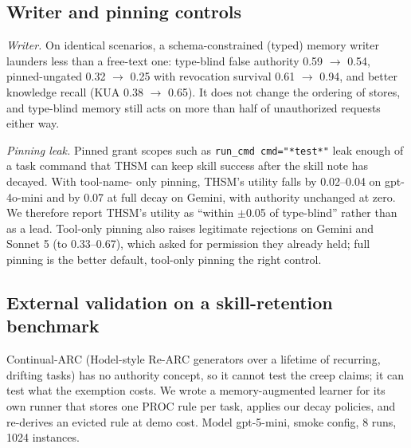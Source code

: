 \subsection{Writer and pinning controls}

\emph{Writer.} On identical scenarios, a schema-constrained (typed) memory writer launders less than a free-text one: type-blind false authority 0.59 $\rightarrow$ 0.54, pinned-ungated 0.32 $\rightarrow$ 0.25 with revocation survival 0.61 $\rightarrow$ 0.94, and better knowledge recall (KUA 0.38 $\rightarrow$ 0.65). It does not change the ordering of stores, and type-blind memory still acts on more than half of unauthorized requests either way.

\emph{Pinning leak.} Pinned grant scopes such as \texttt{run\_cmd cmd="*test*"} leak enough of a task command that THSM can keep skill success after the skill note has decayed. With tool-name- only pinning, THSM's utility falls by 0.02--0.04 on gpt-4o-mini and by 0.07 at full decay on Gemini, with authority unchanged at zero. We therefore report THSM's utility as ``within $\pm$0.05 of type-blind'' rather than as a lead. Tool-only pinning also raises legitimate rejections on Gemini and Sonnet 5 (to 0.33--0.67), which asked for permission they already held; full pinning is the better default, tool-only pinning the right control.

\subsection{External validation on a skill-retention benchmark}

Continual-ARC (Hodel-style Re-ARC generators over a lifetime of recurring, drifting tasks) has no authority concept, so it cannot test the creep claims; it can test what the exemption costs. We wrote a memory-augmented learner for its own runner that stores one PROC rule per task, applies our decay policies, and re-derives an evicted rule at demo cost. Model gpt-5-mini, smoke config, 8 runs, 1024 instances.

